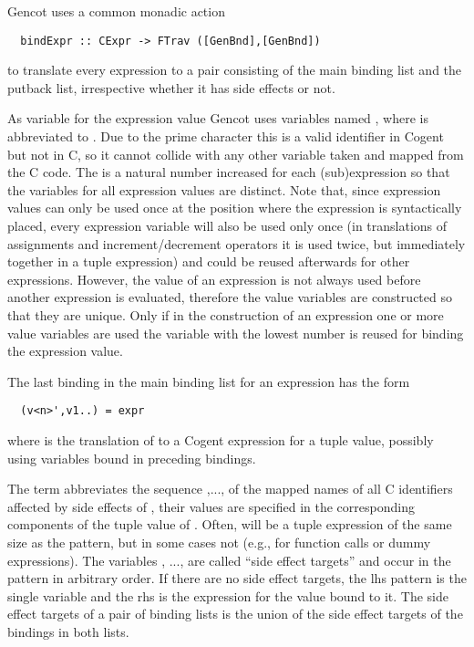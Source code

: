 Gencot uses a common monadic action 
\begin{verbatim}
  bindExpr :: CExpr -> FTrav ([GenBnd],[GenBnd])
\end{verbatim}
to translate every expression to a pair consisting of the main binding list and the putback list, irrespective whether 
it has side effects or not.

As variable for the expression value Gencot uses variables named , where  is abbreviated to 
. Due to the prime character this is
a valid identifier in Cogent but not in C, so it cannot collide with any other variable taken and mapped from the C
code. The  is a natural number increased for each (sub)expression so that the variables for all expression 
values are distinct. Note that, since expression values can only be used once at the position where the expression 
is syntactically placed, every expression variable will also be used only once (in translations of assignments and
increment/decrement operators it is used twice, but immediately together in a tuple expression) and could be reused afterwards for 
other expressions. However, the value of an expression is not always used before another expression is evaluated,
therefore the value variables are constructed so that they are unique. Only if in the construction of an expression
one or more value variables are used the variable with the lowest number is reused for binding the expression value.

The last binding in the main binding list for an expression  has the form
\begin{verbatim}
  (v<n>',v1..) = expr
\end{verbatim}
where  is the translation of  to a Cogent expression for a tuple value, possibly using variables bound 
in preceding bindings. 

The term  abbreviates 
the sequence ,..., of the mapped names of all C identifiers affected by side effects of , their values 
are specified in the corresponding components of the tuple value of . Often,  will be a tuple 
expression of the same size as the pattern, but in some cases not (e.g., for function calls or dummy expressions). 
The variables , ...,  are called ``side effect targets'' and occur in the pattern in arbitrary order.
If there are no side effect targets, the lhs pattern is the single variable  and the rhs is the expression for
the value bound to it. The side effect targets of a 
pair of binding lists is the union of the side effect targets of the bindings in both lists.

